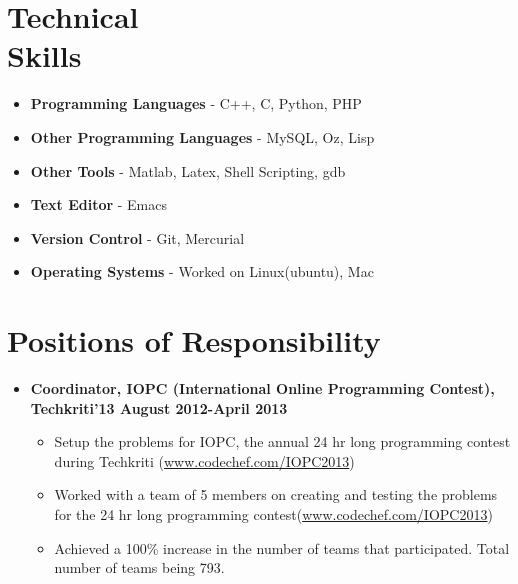 \documentclass[margin,line]{resume}
\begin{document}
\begin{resume}
    \section{\mysidestyle Technical \\Skills} 

    \begin{itemize}
\item \textbf{\textsf{Programming Languages}} -  C++, C, Python, PHP
\item \textbf{\textsf{Other Programming Languages}} -  MySQL, Oz, Lisp
\item \textbf{\textsf{Other Tools}} - Matlab, Latex, Shell Scripting, gdb
\item \textbf{\textsf{Text Editor}} - Emacs
\item \textbf{\textsf{Version Control}} - Git, Mercurial
\item \textbf{\textsf{Operating Systems}} - Worked on Linux(ubuntu), Mac
\end{itemize}

    \section{\mysidestyle Positions of Responsibility} 

    \begin{itemize}

    \item  \textbf{\textsf{Coordinator, IOPC (International Online Programming Contest), Techkriti'13 August 2012-April 2013}}
      \begin{itemize}
      \item Setup the problems for IOPC, the annual 24 hr long programming contest during Techkriti (\url{www.codechef.com/IOPC2013})
      \item Worked with a team of 5 members on creating and testing the problems for the 24 hr long programming contest(\url{www.codechef.com/IOPC2013})

        \newpage

      \item Achieved a 100\% increase in the number of teams that participated. Total number of teams being 793. 
      \end{itemize}
      

\end{itemize}
\end{resume}
\end{document}

